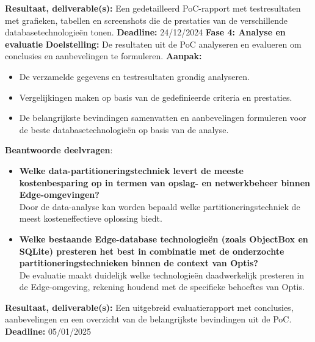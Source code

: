     \textbf{Resultaat, deliverable(s):} Een gedetailleerd PoC-rapport met testresultaten met grafieken, tabellen en screenshots die de prestaties van de verschillende databasetechnologieën tonen.\newline\newline
    \textbf{Deadline:} 24/12/2024\newline\newline
\textbf{Fase 4: Analyse en evaluatie}\newline\newline
    \textbf{Doelstelling:} De resultaten uit de PoC analyseren en evalueren om conclusies en aanbevelingen te formuleren.\newline\newline
    \textbf{Aanpak:}
    \begin{itemize}
        \item De verzamelde gegevens en testresultaten grondig analyseren.
        \item Vergelijkingen maken op basis van de gedefinieerde criteria en prestaties.
        \item De belangrijkste bevindingen samenvatten en aanbevelingen formuleren voor de beste databasetechnologieën op basis van de analyse.\newline
    \end{itemize}
    \textbf{Beantwoorde deelvragen}:
    \begin{itemize}
    \item \textbf{Welke data-partitioneringstechniek levert de meeste kostenbesparing op in termen van opslag- en netwerkbeheer binnen \vspace{0em}\\ Edge-omgevingen?} \\
      Door de data-analyse kan worden bepaald welke partitioneringstechniek de meest kosteneffectieve oplossing biedt.
    \item \textbf{Welke bestaande Edge-database technologieën (zoals ObjectBox en SQLite) presteren het best in combinatie met de onderzochte partitioneringstechnieken binnen de context van Optis?} \\
      De evaluatie maakt duidelijk welke technologieën daadwerkelijk presteren in de Edge-omgeving, rekening houdend met de specifieke behoeftes van Optis.
    \end{itemize}
    \textbf{Resultaat, deliverable(s):} Een uitgebreid evaluatierapport met conclusies, aanbevelingen en een overzicht van de belangrijkste bevindingen uit de PoC.\newline\newline
    \textbf{Deadline:} 05/01/2025\newline\newline

